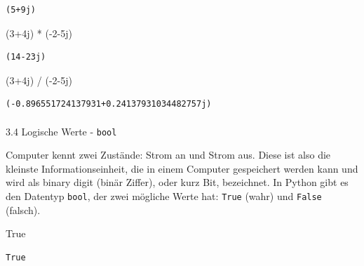 \documentclass[
  11pt,
  a4paper,
  DIV=11,
  numbers=noendperiod]{scrartcl}
\makeatletter
\let\oldparagraph\paragraph
\renewcommand{\paragraph}{
    \@ifstar
      \xxxParagraphStar
      \xxxParagraphNoStar
  }
\newcommand{\xxxParagraphStar}[1]{\oldparagraph*{#1}\mbox{}}
\newcommand{\xxxParagraphNoStar}[1]{\oldparagraph{#1}\mbox{}}
\newenvironment{Shaded}{\begin{snugshade}}{\end{snugshade}}
\newcommand{\DecValTok}[1]{\textcolor[rgb]{0.68,0.00,0.00}{#1}}
\newcommand{\NormalTok}[1]{\textcolor[rgb]{0.00,0.23,0.31}{#1}}
\newcommand{\OperatorTok}[1]{\textcolor[rgb]{0.37,0.37,0.37}{#1}}
\newcommand{\OtherTok}[1]{\textcolor[rgb]{0.00,0.23,0.31}{#1}}
\newcommand{\VariableTok}[1]{\textcolor[rgb]{0.07,0.07,0.07}{#1}}
\makeatother
\begin{document}
\begin{verbatim}
(5+9j)
\end{verbatim}

\begin{Shaded}
\begin{Highlighting}[numbers=left,,]
\NormalTok{(}\DecValTok{3}\OperatorTok{+}\OtherTok{4j}\NormalTok{) }\OperatorTok{*}\NormalTok{ (}\OperatorTok{{-}}\DecValTok{2}\OperatorTok{{-}}\OtherTok{5j}\NormalTok{)}
\end{Highlighting}
\end{Shaded}

\begin{verbatim}
(14-23j)
\end{verbatim}

\begin{Shaded}
\begin{Highlighting}[numbers=left,,]
\NormalTok{(}\DecValTok{3}\OperatorTok{+}\OtherTok{4j}\NormalTok{) }\OperatorTok{/}\NormalTok{ (}\OperatorTok{{-}}\DecValTok{2}\OperatorTok{{-}}\OtherTok{5j}\NormalTok{)}
\end{Highlighting}
\end{Shaded}

\begin{verbatim}
(-0.896551724137931+0.24137931034482757j)
\end{verbatim}

\paragraph{\texorpdfstring{3.4 Logische Werte -
\texttt{bool}}{3.4 Logische Werte - bool}}\label{logische-werte---bool}

Computer kennt zwei Zustände: Strom an und Strom aus. Diese ist also die
kleinste Informationseinheit, die in einem Computer gespeichert werden
kann und wird als binary digit (binär Ziffer), oder kurz Bit,
bezeichnet. In Python gibt es den Datentyp \texttt{bool}, der zwei
mögliche Werte hat: \texttt{True} (wahr) und \texttt{False} (falsch).

\begin{Shaded}
\begin{Highlighting}[numbers=left,,]
\VariableTok{True}

\end{Highlighting}
\end{Shaded}

\begin{verbatim}
True
\end{verbatim}
\end{document}
